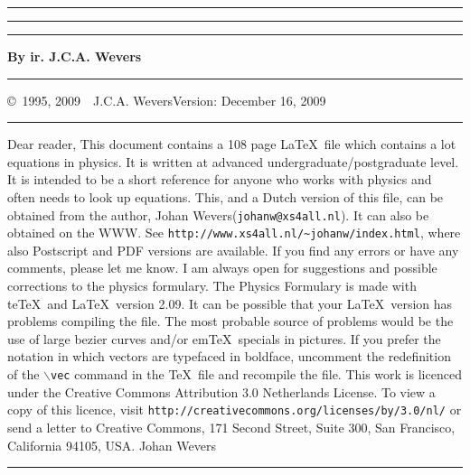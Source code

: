 \thispagestyle{empty}
\setcounter{page}{0}
\hrule
\rule{.4pt}{22.85cm}\hspace*{154mm}\rule{.4pt}{22.85cm}
\vspace*{-18cm}
\begin{center}
\Huge
{}
\end{center}
\vspace{2cm}
\centerline{\Large\bf By ir. J.C.A. Wevers}
\vspace*{2cm}
\vfill
\hrule
\newpage
\thispagestyle{empty}
\copyright~1995, 2009~~J.C.A. Wevers\hfill Version: December 16, 2009
\npar
\hrule
\par
\bigskip
Dear reader,
\npar
This document contains a 108 page \LaTeX\ file which contains a lot equations
in physics. It is written at advanced undergraduate/postgraduate level. It is
intended to be a short reference for anyone who works with physics and often
needs to look up equations.
\npar
This, and a Dutch version of this file, can be obtained from the author,
Johan Wevers\linebreak ({\tt johanw@xs4all.nl}).
\npar
It can also be obtained on the WWW. See
{\tt http://www.xs4all.nl/\~{}johanw/index.html}, where also Postscript
and PDF versions are available.
\npar
If you find any errors or have any comments, please let me know. I am always
open for suggestions and possible corrections to the physics formulary.
\npar
The Physics Formulary is made with te\TeX\ and \LaTeX\ version 2.09. It can
be possible that your \LaTeX\ version has problems compiling the file. The
most probable source of problems would be the use of large bezier curves
and/or em\TeX\ specials in pictures. If you prefer the notation in which
vectors are typefaced in boldface, uncomment the redefinition of the
{\tt $\backslash$vec} command in the \TeX\ file and recompile the file.
\npar
This work is licenced under the Creative Commons Attribution 3.0 Netherlands License.
To view a copy of this licence, visit {\tt http://creativecommons.org/licenses/by/3.0/nl/} or send
a letter to Creative Commons, 171 Second Street, Suite 300, San Francisco, California 94105, USA.
\npar
Johan Wevers
\vfill
\hrule
\newpage

\tableofcontents
\newpage


